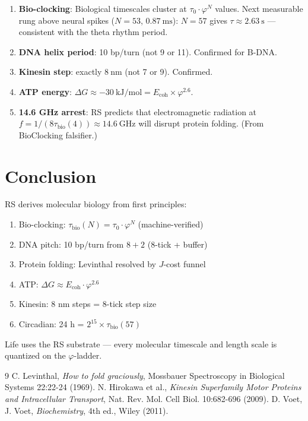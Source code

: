 \documentclass[12pt,a4paper]{article}
\theoremstyle{definition}
\theoremstyle{remark}
\begin{document}
\begin{enumerate}
\item \textbf{Bio-clocking}: Biological timescales cluster at $\tau_0 \cdot \varphi^N$ values.
Next measurable rung above neural spikes ($N = 53$, $0.87~\text{ms}$): 
$N = 57$ gives $\tau \approx 2.63~\text{s}$ — consistent with the theta rhythm period.

\item \textbf{DNA helix period}: 10 bp/turn (not 9 or 11). Confirmed for B-DNA.

\item \textbf{Kinesin step}: exactly $8~\text{nm}$ (not 7 or 9). Confirmed.

\item \textbf{ATP energy}: $\Delta G \approx -30~\text{kJ/mol} = E_\mathrm{coh} \times \varphi^{2.6}$.

\item \textbf{14.6 GHz arrest}: RS predicts that electromagnetic radiation at 
$f = 1/(8\tau_\mathrm{bio}(4)) \approx 14.6~\text{GHz}$ will disrupt protein folding.
(From BioClocking falsifier.)
\end{enumerate}

\section{Conclusion}

RS derives molecular biology from first principles:
\begin{enumerate}
\item Bio-clocking: $\tau_\mathrm{bio}(N) = \tau_0 \cdot \varphi^N$ (machine-verified)
\item DNA pitch: 10 bp/turn from $8 + 2$ (8-tick + buffer)
\item Protein folding: Levinthal resolved by $J$-cost funnel
\item ATP: $\Delta G \approx E_\mathrm{coh} \cdot \varphi^{2.6}$
\item Kinesin: 8 nm steps = 8-tick step size
\item Circadian: 24 h = $2^{15} \times \tau_\mathrm{bio}(57)$
\end{enumerate}

Life uses the RS substrate — every molecular timescale and length scale is 
quantized on the $\varphi$-ladder.

\begin{thebibliography}{9}
 C. Levinthal, \emph{How to fold graciously}, Mossbauer Spectroscopy in Biological Systems 22:22-24 (1969).
 N. Hirokawa et al., \emph{Kinesin Superfamily Motor Proteins and Intracellular Transport}, Nat. Rev. Mol. Cell Biol. 10:682-696 (2009).
 D. Voet, J. Voet, \emph{Biochemistry}, 4th ed., Wiley (2011).
\end{thebibliography}
\end{document}
